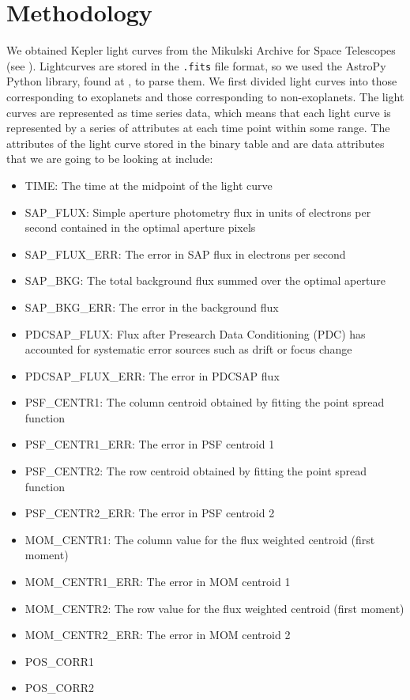 \documentclass{amsart}
\begin{document}
\section{Methodology}
We obtained Kepler light curves from the Mikulski Archive for Space Telescopes (see \cite{mast}). Lightcurves are stored in the \texttt{.fits} file format, so we used the AstroPy Python library, found at \cite{AstroPy}, to parse them. We first divided light curves into those corresponding to exoplanets and those corresponding to non-exoplanets. The light curves are represented as time series data, which means that each light curve is represented by a series of attributes at each time point within some range. The attributes of the light curve stored in the binary table and are data attributes that we are going to be looking at include:
\begin{itemize}
	\item TIME: The time at the midpoint of the light curve
	\item SAP\_FLUX: Simple aperture photometry flux in units of electrons per second contained in the optimal aperture pixels
	\item SAP\_FLUX\_ERR: The error in SAP flux in electrons per second
	\item SAP\_BKG: The total background flux summed over the optimal aperture
	\item SAP\_BKG\_ERR: The error in the background flux
	\item PDCSAP\_FLUX: Flux after Presearch Data Conditioning (PDC) has accounted for systematic error sources such as drift or focus change
	\item PDCSAP\_FLUX\_ERR: The error in PDCSAP flux
	\item PSF\_CENTR1: The column centroid obtained by fitting the point spread function
	\item PSF\_CENTR1\_ERR: The error in PSF centroid 1
	\item PSF\_CENTR2: The row centroid obtained by fitting the point spread function
	\item PSF\_CENTR2\_ERR: The error in PSF centroid 2
	\item MOM\_CENTR1: The column value for the flux weighted centroid (first moment)
	\item MOM\_CENTR1\_ERR: The error in MOM centroid 1
	\item MOM\_CENTR2: The row value for the flux weighted centroid (first moment)
	\item MOM\_CENTR2\_ERR: The error in MOM centroid 2
	\item POS\_CORR1
	\item POS\_CORR2
\end{itemize}
\end{document}
